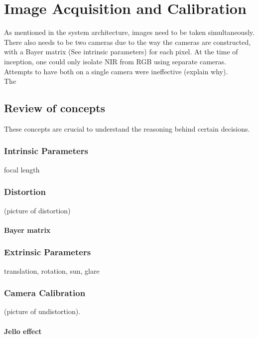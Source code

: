 \chapter{Image Acquisition and Calibration}

As mentioned in the system architecture, images need to be taken simultaneously. There also needs to be two cameras due to the way the cameras are constructed, with a Bayer matrix (See intrinsic parameters) for each pixel. At the time of inception, one could only isolate NIR from RGB using separate cameras. Attempts to have both on a single camera were ineffective (explain why).\\

The

\section{Review of concepts}

These concepts are crucial to understand the reasoning behind certain decisions.

\subsection{Intrinsic Parameters}

focal length

\subsection{Distortion}

(picture of distortion)

\subsubsection{Bayer matrix}

\subsection{Extrinsic Parameters}

translation, rotation, sun, glare

\subsection{Camera Calibration}

(picture of undistortion).

\subsubsection{Jello effect}

